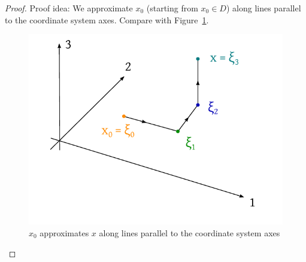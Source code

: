 \documentclass{article}
\begin{document}
\begin{proof}
  Proof idea: We approximate $x_0$ (starting from $x_0 \in D$) along lines parallel to the coordinate system axes. Compare with Figure~\ref{img:x0xcoord}.

  \begin{figure}[t]
    \begin{center}
      \includegraphics{img/34_axes.pdf}
      \caption{$x_0$ approximates $x$ along lines parallel to the coordinate system axes}
      \label{img:x0xcoord}
    \end{center}
  \end{figure}


\end{proof}
\end{document}
